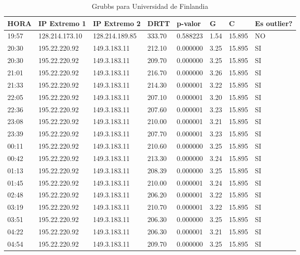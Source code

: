 \begin{table}[H]
	\centering
	\caption{Grubbs para Universidad de Finlandia}
	\label{table:grubbs-finlandia}
	\begin{tabular}{|l|l|l|l|l|l|l|l|}
		\hline
		HORA & IP Extremo 1 & IP Extremo 2 & DRTT & p-valor & G & C & Es outlier? \\ \hline 
19:57 & 128.214.173.10 & 128.214.189.85 & 333.70 & 0.588223 & 1.54 & 15.895 & NO \\ \hline
20:30 & 195.22.220.92 & 149.3.183.11 & 212.10 & 0.000000 & 3.25 & 15.895 & SI \\ \hline
20:30 & 195.22.220.92 & 149.3.183.11 & 209.70 & 0.000000 & 3.25 & 15.895 & SI \\ \hline
21:01 & 195.22.220.92 & 149.3.183.11 & 216.70 & 0.000000 & 3.26 & 15.895 & SI \\ \hline
21:33 & 195.22.220.92 & 149.3.183.11 & 214.30 & 0.000001 & 3.22 & 15.895 & SI \\ \hline
22:05 & 195.22.220.92 & 149.3.183.11 & 207.10 & 0.000001 & 3.20 & 15.895 & SI \\ \hline
22:36 & 195.22.220.92 & 149.3.183.11 & 207.60 & 0.000001 & 3.23 & 15.895 & SI \\ \hline
23:08 & 195.22.220.92 & 149.3.183.11 & 210.00 & 0.000001 & 3.21 & 15.895 & SI \\ \hline
23:39 & 195.22.220.92 & 149.3.183.11 & 207.70 & 0.000001 & 3.23 & 15.895 & SI \\ \hline
00:11 & 195.22.220.92 & 149.3.183.11 & 210.60 & 0.000000 & 3.25 & 15.895 & SI \\ \hline
00:42 & 195.22.220.92 & 149.3.183.11 & 213.30 & 0.000000 & 3.24 & 15.895 & SI \\ \hline
01:13 & 195.22.220.92 & 149.3.183.11 & 208.39 & 0.000000 & 3.25 & 15.895 & SI \\ \hline
01:45 & 195.22.220.92 & 149.3.183.11 & 210.00 & 0.000001 & 3.24 & 15.895 & SI \\ \hline
02:48 & 195.22.220.92 & 149.3.183.11 & 206.20 & 0.000001 & 3.22 & 15.895 & SI \\ \hline
03:19 & 195.22.220.92 & 149.3.183.11 & 210.70 & 0.000001 & 3.22 & 15.895 & SI \\ \hline
03:51 & 195.22.220.92 & 149.3.183.11 & 206.30 & 0.000000 & 3.25 & 15.895 & SI \\ \hline
04:22 & 195.22.220.92 & 149.3.183.11 & 206.30 & 0.000001 & 3.21 & 15.895 & SI \\ \hline
04:54 & 195.22.220.92 & 149.3.183.11 & 209.70 & 0.000000 & 3.25 & 15.895 & SI \\ \hline

\end{tabular}
\end{table}
